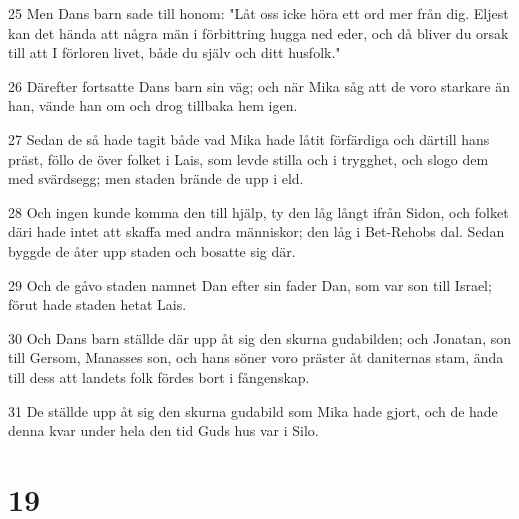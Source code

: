 \par 25 Men Dans barn sade till honom: "Låt oss icke höra ett ord mer från dig. Eljest kan det hända att några män i förbittring hugga ned eder, och då bliver du orsak till att I förloren livet, både du själv och ditt husfolk."
\par 26 Därefter fortsatte Dans barn sin väg; och när Mika såg att de voro starkare än han, vände han om och drog tillbaka hem igen.
\par 27 Sedan de så hade tagit både vad Mika hade låtit förfärdiga och därtill hans präst, föllo de över folket i Lais, som levde stilla och i trygghet, och slogo dem med svärdsegg; men staden brände de upp i eld.
\par 28 Och ingen kunde komma den till hjälp, ty den låg långt ifrån Sidon, och folket däri hade intet att skaffa med andra människor; den låg i Bet-Rehobs dal. Sedan byggde de åter upp staden och bosatte sig där.
\par 29 Och de gåvo staden namnet Dan efter sin fader Dan, som var son till Israel; förut hade staden hetat Lais.
\par 30 Och Dans barn ställde där upp åt sig den skurna gudabilden; och Jonatan, son till Gersom, Manasses son, och hans söner voro präster åt daniternas stam, ända till dess att landets folk fördes bort i fångenskap.
\par 31 De ställde upp åt sig den skurna gudabild som Mika hade gjort, och de hade denna kvar under hela den tid Guds hus var i Silo.

\chapter{19}

